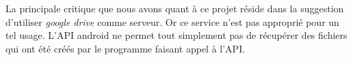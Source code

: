 La principale critique que nous avons quant à ce projet réside dans la suggestion d'utiliser \textit{google drive} comme serveur.
Or ce service n'est pas approprié pour un tel usage. L'API android ne permet tout simplement pas de récupérer des fichiers qui
ont été créés par le programme faisant appel à l'API.
